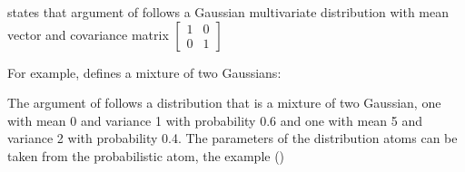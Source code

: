 \documentclass[letterpaper,10pt,english]{sphinxmanual}
\begin{document}
\sphinxAtStartPar
states that argument  of  follows a Gaussian multivariate distribution with mean vector \sphinxcode{\sphinxupquote{{[}0,0{]}}} and covariance matrix \(\begin{bmatrix} 1 & 0 \\ 0 & 1 \end{bmatrix}\)

\sphinxAtStartPar
For example,  defines a mixture of two Gaussians:

\begin{sphinxVerbatim}[commandchars=\\\{\}]
  
  
   
   
\end{sphinxVerbatim}

\sphinxAtStartPar
The argument  of  follows a distribution that is a mixture of two Gaussian, one with mean 0 and variance 1 with probability 0.6 and one with mean 5 and variance 2 with probability 0.4.
The parameters of the distribution atoms can be taken from the probabilistic atom, the example ()

\begin{sphinxVerbatim}[commandchars=\\\{\}]
 
  
  
\end{sphinxVerbatim}
\end{document}
